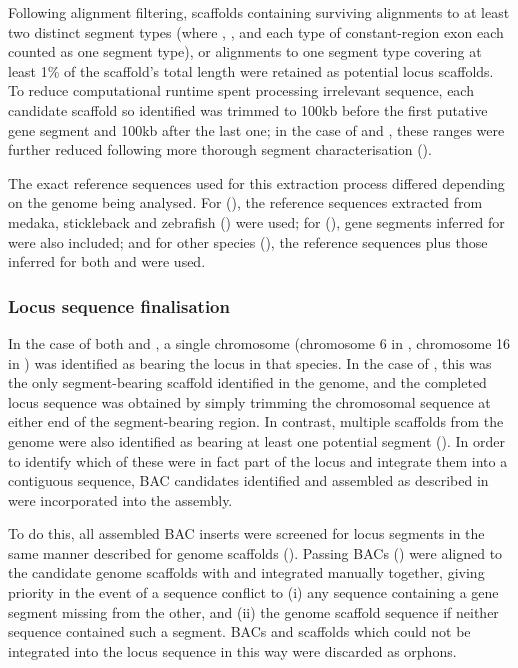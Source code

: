 Following alignment filtering, scaffolds containing surviving alignments to at least two distinct segment types (where \vh, \jh, and each type of constant-region exon each counted as one segment type), or alignments to one segment type covering at least 1\% of the scaffold's total length were retained as potential locus scaffolds. To reduce computational runtime spent processing irrelevant sequence, each candidate scaffold so identified was trimmed to 100kb before the first putative gene segment and 100kb after the last one; in the case of \nfu and \xma, these ranges were further reduced following more thorough segment characterisation ().

The exact reference sequences used for this extraction process differed depending on the genome being analysed. For \nfu (), the reference sequences extracted from medaka, stickleback and zebrafish () were used; for \xma (), gene segments inferred for \Nfu were also included; and for other species (), the reference sequences plus those inferred for both \Nfu and \Xma were used.

\subsubsection{Locus sequence finalisation}
\label{sec:methods_comp_locus_final}

In the case of both \nfu and \xma, a single chromosome (chromosome 6 in \Nfu, chromosome 16 in \Xma) was identified as bearing the \igh{} locus in that species. In the case of \Xma, this was the only segment-bearing scaffold identified in the genome, and the completed locus sequence was obtained by simply trimming the chromosomal sequence at either end of the segment-bearing region. In contrast, multiple scaffolds from the \Nfu genome were also identified as bearing at least one potential \igh{} segment (). In order to identify which of these were in fact part of the locus and integrate them into a contiguous sequence, BAC candidates identified and assembled as described in  were incorporated into the assembly.

To do this, all assembled BAC inserts were screened for \igh{} locus segments in the same manner described for genome scaffolds (). Passing BACs () were aligned to the candidate genome scaffolds with  and integrated manually together, giving priority in the event of a sequence conflict to (i) any sequence containing a gene segment missing from the other, and (ii) the genome scaffold sequence if neither sequence contained such a segment. BACs and scaffolds which could not be integrated into the locus sequence in this way were discarded as orphons.

